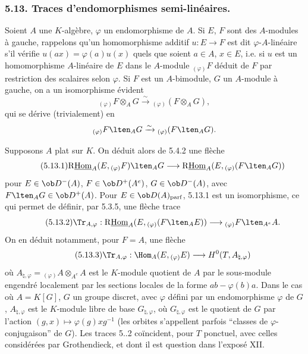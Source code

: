 \subsubsection*{5.13. Traces d'endomorphismes semi-linéaires.}

Soient $A$ une $K$-algèbre, $\varphi$ un endomorphisme de $A$. Si $E$, $F$ sont des $A$-modules à gauche, rappelons qu'un homomorphisme additif $u:E\to F$ est dit $\varphi$-$A$-linéaire s'il vérifie $u(ax)=\varphi(a)u(x)$ quels que soient $a\in A$, $x\in E$, i.e. si $u$ est un homomorphisme $A$-linéaire de $E$ dans le $A$-module ${}_{(\varphi)}F$ déduit de $F$ par restriction des scalaires selon $\varphi$. Si $F$ est un $A$-bimodule,
$G$ un $A$-module à gauche, on a un isomorphisme évident
\[
{}_{(\varphi)}F\otimes_AG\xrightarrow{\sim}{}_{(\varphi)}(F\otimes_AG),
\]
qui se dérive (trivialement) en
\[
{}_{(\varphi)}F\lten_AG\xrightarrow{\sim}{}_{(\varphi)}(F\lten_AG).
\]

Supposons $A$ plat sur $K$. On déduit alors de 5.4.2 une flèche
\begin{equation}\tag{5.13.1}
\mathrm{R}\underline{\mathrm{Hom}}_A(E,{}_{(\varphi)}F)\lten_AG\longrightarrow\mathrm{R}\underline{\mathrm{Hom}}_A(E,{}_{(\varphi)}(F\lten_AG))
\end{equation}
pour $E\in\ob D^-(A)$, $F\in\ob D^+(A^e)$, $G\in\ob D^-(A)$, avec $F\lten_AG\in\ob D^+(A)$. Pour $E\in\ob D(A)_{\mathrm{parf}}$, 5.13.1 est un isomorphisme, ce qui permet de définir, par 5.3.5, une flèche trace
\begin{equation}\tag{5.13.2}
\Tr_{A,\varphi}:\mathrm{R}\underline{\mathrm{Hom}}_A(E,{}_{(\varphi)}(F\lten_AE))\longrightarrow {}_{(\varphi)}F\lten_{A^e}A.
\end{equation}
On en déduit notamment, pour $F=A$, une flèche
\begin{equation}\tag{5.13.3}
\Tr_{A,\varphi}:\Hom_A(E,{}_{(\varphi)}E)\longrightarrow H^0(T,A_{\natural,\varphi})
\end{equation}
où $A_{\natural,\varphi}={}_{(\varphi)}A\otimes_{A^e}A$ est le $K$-module quotient de $A$ par le sous-module engendré localement par les sections locales de la forme $ab-\varphi(b)a$. Dans le cas où $A=K[G]$, $G$ un groupe discret, avec $\varphi$ défini par un endomorphisme $\varphi$ de $G$, $A_{\natural,\varphi}$ est le $K$-module libre de base $G_{\natural,\varphi}$, où $G_{\natural,\varphi}$ est le quotient de $G$ par l'action $(g,x)\mapsto\varphi(g)xg^{-1}$ (les orbites s'appellent parfois ``classes de $\varphi$-conjugaison'' de $G$). Les traces 5..2 coïncident, pour $T$ ponctuel, avec celles considérées par Grothendieck, et dont il est question dans l'exposé XII.

